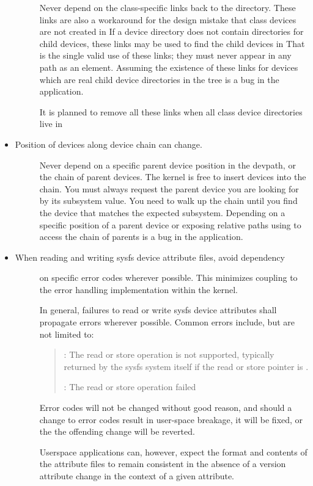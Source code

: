 \documentclass[a4paper,8pt,english]{sphinxmanual}
\begin{document}
\begin{itemize}
\begin{description}
Never depend on the class-specific links back to the 
directory.  These links are also a workaround for the design mistake
that class devices are not created in  If a device
directory does not contain directories for child devices, these links
may be used to find the child devices in  That is the single
valid use of these links; they must never appear in any path as an
element. Assuming the existence of these links for devices which are
real child device directories in the  tree is a bug in
the application.

It is planned to remove all these links when all class device
directories live in 

\end{description}

\item {} \begin{description}
\item[{Position of devices along device chain can change.}] \leavevmode
Never depend on a specific parent device position in the devpath,
or the chain of parent devices. The kernel is free to insert devices into
the chain. You must always request the parent device you are looking for
by its subsystem value. You need to walk up the chain until you find
the device that matches the expected subsystem. Depending on a specific
position of a parent device or exposing relative paths using  to
access the chain of parents is a bug in the application.

\end{description}

\item {} \begin{description}
\item[{When reading and writing sysfs device attribute files, avoid dependency}] \leavevmode
on specific error codes wherever possible. This minimizes coupling to
the error handling implementation within the kernel.

In general, failures to read or write sysfs device attributes shall
propagate errors wherever possible. Common errors include, but are not
limited to:
\begin{quote}

: The read or store operation is not supported, typically
returned by the sysfs system itself if the read or store pointer
is .

: The read or store operation failed
\end{quote}

Error codes will not be changed without good reason, and should a change
to error codes result in user-space breakage, it will be fixed, or the
the offending change will be reverted.

Userspace applications can, however, expect the format and contents of
the attribute files to remain consistent in the absence of a version
attribute change in the context of a given attribute.

\end{description}

\end{itemize}
\end{document}
